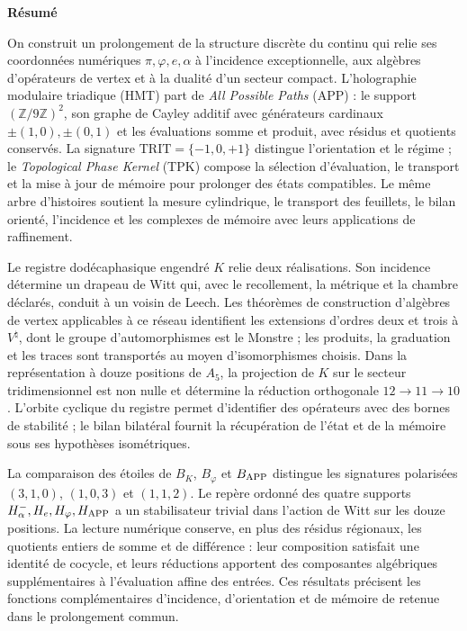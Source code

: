\begin{center}\textbf{Résumé}\end{center}
\begingroup
\fontsize{9.5}{10.7}\selectfont
\setlength{\parskip}{1.5pt plus .5pt minus .5pt}
\noindent
On construit un prolongement de la structure discrète du continu qui
relie ses coordonnées numériques \(\pi,\varphi,e,\alpha\) à l’incidence exceptionnelle, aux
algèbres d’opérateurs de vertex et à la dualité d’un secteur compact.
L’holographie modulaire triadique (HMT) part de \emph{All Possible Paths}
(APP) : le support \((\mathbb Z/9\mathbb Z)^2\), son graphe de Cayley additif
avec générateurs cardinaux \(\pm(1,0),\pm(0,1)\) et les évaluations somme
et produit, avec résidus et quotients conservés. La signature
\(\mathrm{TRIT}=\{-1,0,+1\}\) distingue l’orientation et le régime ; le
\emph{Topological Phase Kernel} (TPK) compose la sélection d’évaluation,
le transport et la mise à jour de mémoire pour prolonger des états compatibles.
Le même arbre d’histoires soutient la mesure cylindrique, le transport
des feuillets, le bilan orienté, l’incidence et les complexes de mémoire
avec leurs applications de raffinement.

Le registre dodécaphasique engendré \(K\) relie deux réalisations.
Son incidence détermine un drapeau de Witt qui, avec le recollement, la métrique
et la chambre déclarés, conduit à un voisin de Leech. Les théorèmes de
construction d’algèbres de vertex applicables à ce réseau identifient
les extensions d’ordres deux et trois à \(V^\natural\), dont le groupe
d’automorphismes est le Monstre ; les produits, la graduation et les
traces sont transportés au moyen d’isomorphismes choisis. Dans la représentation à douze
positions de \(A_5\), la projection de \(K\) sur le secteur
tridimensionnel est non nulle et détermine la réduction orthogonale
\(12\to11\to10\). L’orbite cyclique du registre permet d’identifier
des opérateurs avec des bornes de stabilité ; le bilan bilatéral fournit
la récupération de l’état et de la mémoire sous ses hypothèses isométriques.

La comparaison des étoiles de \(B_K\), \(B_\varphi\) et \(B_{\rm APP}\) distingue
les signatures polarisées \((3,1,0)\), \((1,0,3)\) et \((1,1,2)\).
Le repère ordonné des quatre supports
\(H^-_\alpha,H_e,H_\varphi,H_{\rm APP}\) a un stabilisateur trivial
dans l’action de Witt sur les douze positions. La lecture numérique
conserve, en plus des résidus régionaux, les quotients entiers de
somme et de différence : leur composition satisfait une identité de cocycle,
et leurs réductions apportent des composantes algébriques supplémentaires à
l’évaluation affine des entrées. Ces résultats précisent les
fonctions complémentaires d’incidence, d’orientation et de mémoire de
retenue dans le prolongement commun.

